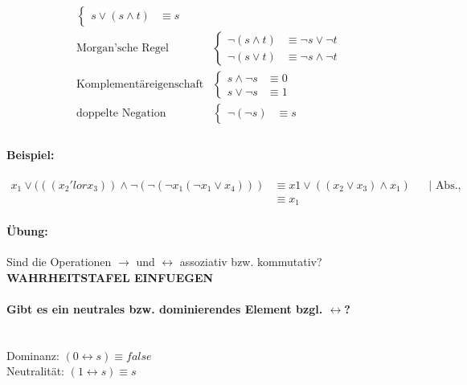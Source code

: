 \begin{align*}
\begin{cases}
s \lor (s \land t) &\equiv s
\end{cases} \\
%
\text{Morgan'sche Regel}&\begin{cases}
\neg (s \land t) &\equiv \neg s \lor \neg t\\
\neg (s \lor t) &\equiv \neg s \land \neg t
\end{cases} \\
%
\text{Komplementäreigenschaft}&\begin{cases}
s \land \neg s &\equiv 0 \\
s \lor \neg s &\equiv 1
\end{cases} \\
%
\text{doppelte Negation}&\begin{cases}
\neg (\neg s) &\equiv s
\end{cases} \\
\end{align*}
%
\paragraph{Beispiel:}
\begin{align*}
x_1 \lor (((x_2 'lor x_3)) \land \neg (\neg(\neg x_1(\neg x_1 \lor x_4)))
&\equiv x1 \lor ((x_2 \lor x_3) \land x_1 )  && \mid \text{ Abs., 2x-Neg., Komm.}\\
&\equiv x_1
\end{align*}
%
\paragraph{Übung: }Sind die Operationen $\rightarrow$ und $\leftrightarrow$ assoziativ bzw. kommutativ?
\ \\ \textbf{WAHRHEITSTAFEL EINFUEGEN}
%
\paragraph{Gibt es ein neutrales bzw. dominierendes Element bzgl. $\leftrightarrow$?}
\ \\Dominanz: $(0 \leftrightarrow s) \equiv false$\\
Neutralität: $(1 \leftrightarrow s) \equiv s$
%
%
